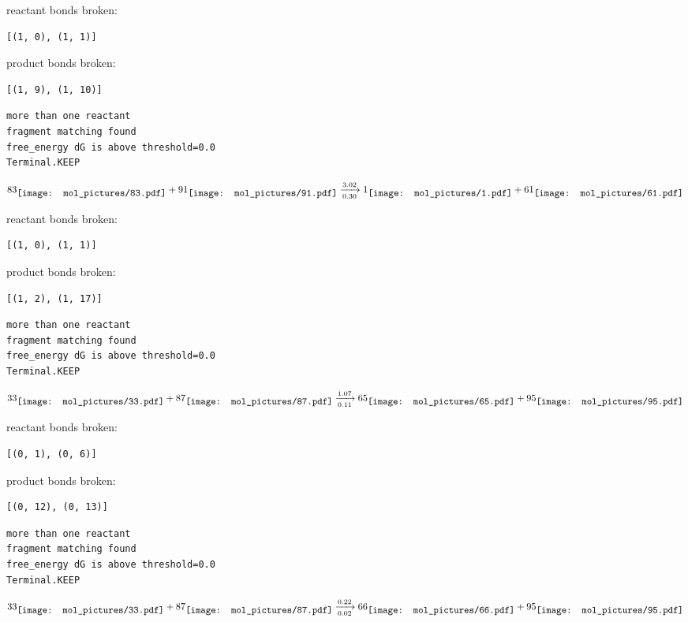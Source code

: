 \documentclass{article}
\begin{document}
reactant bonds broken:\begin{verbatim}
[(1, 0), (1, 1)]
\end{verbatim}
product bonds broken:\begin{verbatim}
[(1, 9), (1, 10)]
\end{verbatim}




\vspace{1cm}
\begin{verbatim}
more than one reactant
fragment matching found
free_energy dG is above threshold=0.0
Terminal.KEEP
\end{verbatim}
$$
83
\raisebox{-.5\height}{\texttt{[image: mol\_pictures/83.pdf]}}
+
91
\raisebox{-.5\height}{\texttt{[image: mol\_pictures/91.pdf]}}
\xrightarrow[0.30]{3.02}
1
\raisebox{-.5\height}{\texttt{[image: mol\_pictures/1.pdf]}}
+
61
\raisebox{-.5\height}{\texttt{[image: mol\_pictures/61.pdf]}}
$$


reactant bonds broken:\begin{verbatim}
[(1, 0), (1, 1)]
\end{verbatim}
product bonds broken:\begin{verbatim}
[(1, 2), (1, 17)]
\end{verbatim}




\vspace{1cm}
\begin{verbatim}
more than one reactant
fragment matching found
free_energy dG is above threshold=0.0
Terminal.KEEP
\end{verbatim}
$$
33
\raisebox{-.5\height}{\texttt{[image: mol\_pictures/33.pdf]}}
+
87
\raisebox{-.5\height}{\texttt{[image: mol\_pictures/87.pdf]}}
\xrightarrow[0.11]{1.07}
65
\raisebox{-.5\height}{\texttt{[image: mol\_pictures/65.pdf]}}
+
95
\raisebox{-.5\height}{\texttt{[image: mol\_pictures/95.pdf]}}
$$


reactant bonds broken:\begin{verbatim}
[(0, 1), (0, 6)]
\end{verbatim}
product bonds broken:\begin{verbatim}
[(0, 12), (0, 13)]
\end{verbatim}




\vspace{1cm}
\begin{verbatim}
more than one reactant
fragment matching found
free_energy dG is above threshold=0.0
Terminal.KEEP
\end{verbatim}
$$
33
\raisebox{-.5\height}{\texttt{[image: mol\_pictures/33.pdf]}}
+
87
\raisebox{-.5\height}{\texttt{[image: mol\_pictures/87.pdf]}}
\xrightarrow[0.02]{0.22}
66
\raisebox{-.5\height}{\texttt{[image: mol\_pictures/66.pdf]}}
+
95
\raisebox{-.5\height}{\texttt{[image: mol\_pictures/95.pdf]}}
$$
\end{document}
